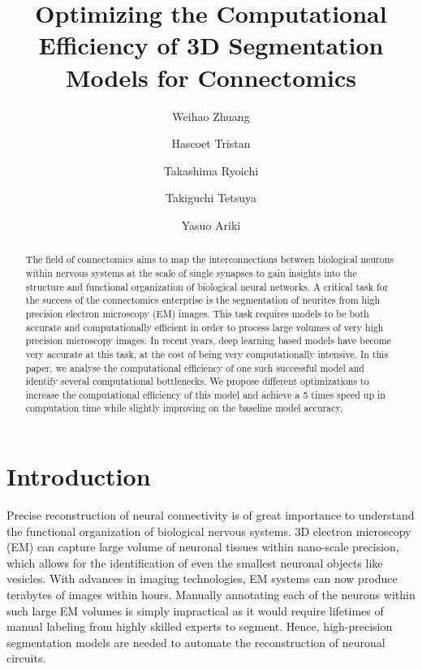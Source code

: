 \documentclass[runningheads]{llncs}
\begin{document}
\title{Optimizing the Computational Efficiency of 3D Segmentation Models for Connectomics}


\author{
Weihao Zhuang  %
\and
Hascoet Tristan %
\and
Takashima Ryoichi %
\and
Takiguchi Tetsuya %
\and
Yasuo Ariki %
}



\maketitle            

\begin{abstract}
The field of connectomics aims to map the interconnections between biological neurons within nervous systems at the scale of single synapses to gain insights into the structure and functional organization of biological neural networks. 
A critical task for the success of the connectomics enterprise is the segmentation of neurites from high precision electron microscopy (EM) images. 
This task requires models to be both accurate and computationally efficient in order to process large volumes of very high precision microscopy images. 
In recent years, deep learning based models have become very accurate at this task, at the cost of being very computationally intensive.
In this paper, we analyse the computational efficiency of one such successful model and identify several computational bottlenecks. 
We propose different optimizations to increase the computational efficiency of this model 
and achieve a 5 times speed up in computation time while slightly improving on the baseline model accuracy.

\end{abstract}

\section{Introduction}
Precise reconstruction of neural connectivity is of great importance to understand the functional organization of biological nervous systems. 
3D electron microscopy (EM) can capture large volume of neuronal tissues within nano-scale precision, which allows for the identification of even the smallest neuronal objects like vesicles. 
With advances in imaging technologies, EM systems can now produce terabytes of images within hours. 
Manually annotating each of the neurons within such large EM volumes is simply impractical as it would require lifetimes of manual labeling from highly skilled experts to segment. 
Hence, high-precision segmentation models are needed to automate the reconstruction of neuronal circuits. 
\end{document}

